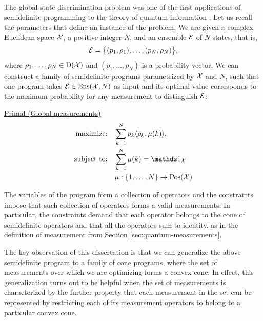 The global state discrimination problem was one of the 
first applications of semidefinite programming to the theory of quantum 
information \cite{Eldar03a}.
Let us recall the parameters that define an instance of the problem. 
We are given a complex Euclidean space $\mathcal{X}$, a positive integer $N$, and an 
ensemble $\mathcal{E}$ of $N$ states, that is,
\begin{equation}
\label{eq:ensemble}
    \mathcal{E} = \big\{ (p_{1}, \rho_{1}), \ldots, (p_{N}, \rho_{N}) \big\},
\end{equation}
where $\rho_{1}, \ldots, \rho_{N} \in \mathrm{D}(\mathcal{X})$ and $(p_{1}, \ldots, p_{N})$ is
a probability vector.
We can construct a family of semidefinite programs parametrized by $\mathcal{X}$
and $N$, such that one program takes $\mathcal{E} \in \mathrm{Ens}(\mathcal{X}, N)$ as input and 
its optimal value corresponds to the maximum probability for any measurement to 
distinguish $\mathcal{E}$:
\begin{center}
\underline{Primal (Global measurements)}
\begin{equation}
  \label{eq:pos-primal-problem}
  \begin{split}
    \text{maximize:} \quad & 
    \sum_{k=1}^{N} p_{k}\ip{\rho_{k}}{\mu(k)},\\
    \text{subject to:} \quad & \sum_{k=1}^{N} \mu(k) = \I_{\X}\\
      & \mu : \{1,\ldots, N\}\rightarrow \Pos(\X)
  \end{split}
\end{equation}
\end{center}

The variables of the program form a collection of operators and the constraints 
impose that such collection of operators forms a valid measurements. 
In particular, the constraints demand that each operator belongs to the cone of 
semidefinite operators and that all the operators sum to identity, as in the
definition of measurement from Section \ref{sec:quantum-measurements}.

The key observation of this dissertation is that we can generalize the
above semidefinite program to a family of cone programs, where
the set of measurements over which we are optimizing forms a convex cone.
In effect, this generalization turns out to be helpful when the set of
measurements is characterized by the further property that each measurement in 
the set can be represented by restricting each of its measurement operators to 
belong to a particular convex cone.


